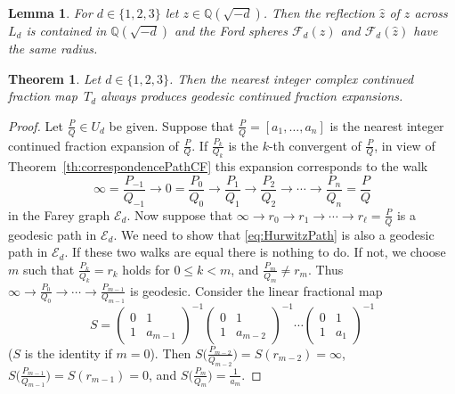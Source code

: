 \documentclass[10pt,a4paper]{amsart}
\newtheorem{theorem}{Theorem}
\newtheorem{lemma}{Lemma}
\begin{document}
\begin{lemma}\label{lem:prepgeoalg}
For $d\in \{1,2,3\}$ let $z \in \mathbb Q(\sqrt{-d})$.  Then the reflection $\hat{z}$ of $z$ across 
$L_{d}$ is contained in $\mathbb Q(\sqrt{-d})$ and the Ford spheres $\mathcal F_d(z)$ 
and $\mathcal F_d(\hat{z})$ have the same radius.  
\end{lemma} 

\begin{theorem}
Let $d \in \{1, 2, 3\}$. Then the nearest integer complex continued fraction map~$T_d$ always produces geodesic continued fraction expansions. 
\end{theorem}

\begin{proof}
Let $\frac{P}{Q} \in U_{d}$ be given. Suppose that
$\frac{P}{Q}= [a_1,\ldots, a_n]$ is the nearest integer continued fraction expansion of 
$\frac{P}{Q}$. If $\frac{P_k}{Q_k}$ is the $k$-th convergent of $\frac PQ$, in view of Theorem~\ref{th:correspondencePathCF} this expansion corresponds to the walk
\begin{equation}\label{eq:HurwitzPath}
\infty=\frac{P_{-1}}{Q_{-1}} \to 0=\frac{P_0}{Q_0} \to \frac{P_1}{Q_1} \to \frac{P_2}{Q_2} \to \cdots \to \frac{P_n}{Q_n}=\frac{P}{Q}
\end{equation}
in the Farey graph $\mathcal{E}_{d}$. Now suppose that
$\infty \to r_0 \to r_1 \to \cdots \to r_{\ell}=\frac{P}{Q}$ is a geodesic path in $\mathcal{E}_{d}$. We need to show that \eqref{eq:HurwitzPath} is also a geodesic path in $\mathcal{E}_{d}$. If these two walks are equal there is nothing to do. If not, we choose $m$ such that $\frac{P_{k}}{Q_{k}}=r_{k}$ holds for $0 \leq k <m$, and $\frac{P_m}{Q_m} \neq r_m$. Thus $\infty \to \frac{P_0}{Q_0}\to\cdots\to \frac{P_{m-1}}{Q_{m-1}}$ is geodesic. Consider the linear fractional map 
$$
S=\begin{pmatrix}
0 & 1 \\
1 & a_{m-1}
\end{pmatrix}^{-1}
\begin{pmatrix}
0 & 1 \\
1 & a_{m-2}
\end{pmatrix}^{-1} 
\cdots 
\begin{pmatrix}
0 & 1 \\
1 & a_1
\end{pmatrix}^{-1}
$$
($S$ is the identity if $m=0$).  Then $S\big(\frac{P_{m-2}}{Q_{m-2}}\big)=S(r_{m-2})=\infty$, $S\big(\frac{P_{m-1}}{Q_{m-1}}\big)=S(r_{m-1})=0$, and $S\big(\frac{P_m}{Q_m}\big)=\frac{1}{a_m}$. 

\end{proof}
\end{document}
